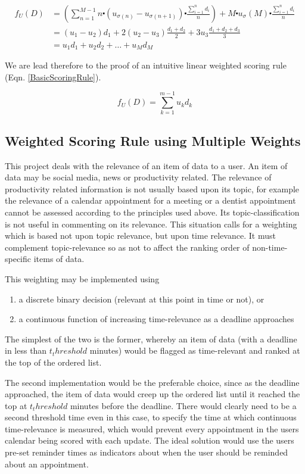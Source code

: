 \begin{align}\label{OurWeightedRuleDerivation}
f_U (D) &= \left(\sum_{n=1}^{M-1} n\centerdot (u_{\sigma{(n)}} - u_{\sigma{(n+1)}})\centerdot \frac{\sum_{i=1}^{n} d_i}{n}\right) + M \centerdot u_\sigma{(M)} \centerdot \frac{\sum_{i=1}^{n} d_i}{n} 
\\ &= (u_1-u_2)d_1 + 2(u_2-u_3)\frac{d_1+d_2}{2} + 3u_3\frac{d_1+d_2+d_3}{3}
\\ &= u_1d_1 + u_2d_2 + \dots + u_Md_M
\end{align}

We are lead therefore to the proof of an intuitive linear weighted scoring rule (Eqn. \ref{BasicScoringRule}).

\begin{equation}\label{BasicScoringRule}
f_U (D) = \sum_{k=1}^{m-1} u_kd_k
\end{equation}

\subsection{Weighted Scoring Rule using Multiple Weights}

This project deals with the relevance of an item of data to a user. An item of data may be social media, news or productivity related. The relevance of productivity related information is not usually based upon its topic, for example the relevance of a calendar appointment for a meeting or a dentist appointment cannot be assessed according to the principles used above. Its topic-classification is not useful in commenting on its relevance. This situation calls for a weighting which is based not upon topic relevance, but upon time relevance. It must complement topic-relevance so as not to affect the ranking order of non-time-specific items of data. 

This weighting may be implemented using 
\begin{enumerate}
  \item a discrete binary decision (relevant at this point in time or not), or 
  \item a continuous function of increasing time-relevance as a deadline approaches
\end{enumerate}

The simplest of the two is the former, whereby an item of data (with a deadline in less than $t_threshold$ minutes) would be flagged as time-relevant and ranked at the top of the ordered list. 

The second implementation would be the preferable choice, since as the deadline approached, the item of data would creep up the ordered list until it reached the top at $t_threshold$ minutes before the deadline. There would clearly need to be a second threshold time even in this case, to specify the time at which continuous time-relevance is measured, which would prevent every appointment in the users calendar being scored with each update. The ideal solution would use the users pre-set reminder times as indicators about when the user should be reminded about an appointment. 


